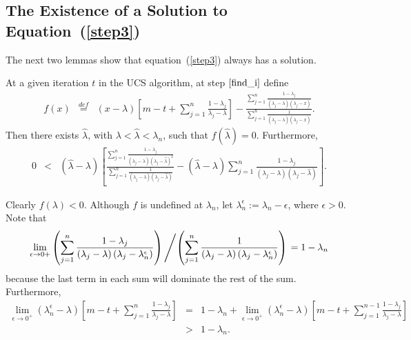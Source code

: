 \documentclass[final,leqno,onefignum,onetabnum]{siamltex1213}
\begin{document}
\subsection{The Existence of a Solution to Equation~(\ref{step3})}\label{sec:31}
The next two lemmas show that equation~(\ref{step3}) always has a solution.
\begin{lemma}\label{lemma:1}
At a given iteration $t$ in the UCS algorithm, at step $\ref{find_i}$ define
\begin{eqnarray}
f(x)&\stackrel{def}=&{\displaystyle \left(x-\lambda\right)\left[m-t+\sum_{j=1}^n\frac{1-\lambda_j}{\lambda_j-\lambda}\right]-\frac{\sum_{j=1}^n\frac{1-\lambda_j}{\left(\lambda_j-\lambda\right)\left(\lambda_j-x\right)}}{\sum_{j=1}^n\frac{1}{\left(\lambda_j-\lambda\right)\left(\lambda_j-x\right)}}.}\nonumber
\end{eqnarray}
Then there exists $\widehat{\lambda}$, with $\lambda<\widehat{\lambda}<\lambda_n$, such that $f\left(\widehat{\lambda}\right)=0$.  Furthermore,
\small
\begin{eqnarray}
0&<&{\displaystyle \left(\widehat{\lambda}-\lambda\right)\left[\frac{\sum_{j=1}^n\frac{1-\lambda_j}{\left(\lambda_j-\lambda\right)\left(\lambda_j-\widehat{\lambda}\right)^2}}{\sum_{j=1}^n\frac{1}{\left(\lambda_j-\lambda\right)\left(\lambda_j-\widehat{\lambda}\right)}}-\left(\widehat{\lambda}-\lambda\right)\sum_{j=1}^n\frac{1-\lambda_j}{\left(\lambda_j-\lambda\right)\left(\lambda_j-\widehat{\lambda}\right)}\right].}\label{eqn:gz}
\end{eqnarray}
\end{lemma}
\normalsize
\proof
Clearly $f\left(\lambda\right)<0$.  Although $f$ is undefined at
$\lambda_n$, let $\lambda_n^\epsilon:=\lambda_n-\epsilon$, where
$\epsilon > 0$.  Note that
\begin{eqnarray*}
{\displaystyle \lim_{\epsilon\rightarrow 0+}\left(\sum_{j=1}^n\frac{1-\lambda_j}{\left(\lambda_j-\lambda\right)\left(\lambda_j-\lambda_n^\epsilon\right)}\right) \left/ \left(\sum_{j=1}^n\frac{1}{\left(\lambda_j-\lambda\right)\left(\lambda_j-\lambda_n^\epsilon\right)}\right)\right.}  ={\displaystyle 1-\lambda_n}
\end{eqnarray*}
because the last term in each sum will dominate the rest of the sum.  Furthermore,
\begin{eqnarray}
{\displaystyle \lim_{\epsilon\rightarrow 0^+}\left(\lambda_n^\epsilon-\lambda\right)\left[m-t+\sum_{j=1}^n\frac{1-\lambda_j}{\lambda_j-\lambda}\right]}&=&{\displaystyle 1-\lambda_n+\lim_{\epsilon\rightarrow 0^+}\left(\lambda_n^\epsilon-\lambda\right)\left[m-t+\sum_{j=1}^{n-1}\frac{1-\lambda_j}{\lambda_j-\lambda}\right]}\nonumber\\
&>&{\displaystyle 1-\lambda_n }.\nonumber
\end{eqnarray}
\end{document}
